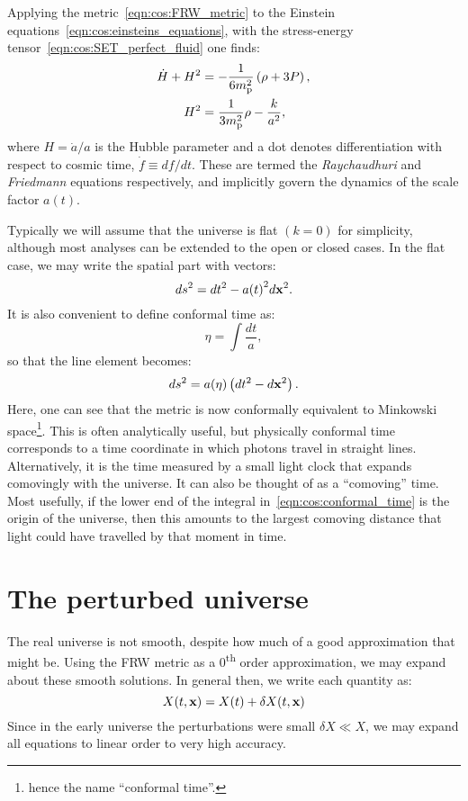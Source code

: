 Applying the metric~\eqref{eqn:cos:FRW_metric} to the Einstein equations~\eqref{eqn:cos:einsteins_equations}, with the stress-energy tensor~\eqref{eqn:cos:SET_perfect_fluid} one finds:
\begin{align}
  \dot{H}+H^2 &= 
  -\frac{1}{6m_{\mathrm{p}}^2}\left( \rho + 3P\right), 
  \label{eqn:Raychaudhuri_rho}
  \\
  H^2 &= 
  \frac{1}{3m_{\mathrm{p}}^2}\rho - \frac{k}{a^2}, 
\end{align}
%
where $H=\dot{a}/a$ is the Hubble parameter and a dot denotes differentiation with respect to cosmic time, $\dot{f}\equiv df/dt$. These are termed the {\em Raychaudhuri\/} and {\em Friedmann\/} equations respectively, and implicitly govern the dynamics of the scale factor $a(t)$. 


 Typically we will assume that the universe is flat $(k=0)$ for simplicity, although most analyses can be extended to the open or closed cases. In the flat case, we may write the spatial part with vectors:
\begin{equation}
  ds^2 = dt^2 - a{(t)}^2 d{\mathbf{x}}^2.
  \label{eqn:cos:flat_FRW}
\end{equation}
It is also convenient to define conformal time as:
\begin{equation}
  \eta = \int \frac{dt}{a},
  \label{eqn:cos:conformal_time}
\end{equation}
so that the line element becomes:
\begin{equation}
  ds^2 = a(\eta)\left( dt^2 - d{\mathbf{x}}^2 \right).
  \label{eqn:cos:flat_FRW}
\end{equation}
Here, one can see that the metric is now conformally equivalent to Minkowski space\footnote{hence the name ``conformal time''.}.
This is often analytically useful, but physically conformal time corresponds to a time coordinate in which photons travel in straight lines. Alternatively, it is the time measured by a small light clock that expands comovingly with the universe. It can also be thought of as a ``comoving'' time. Most usefully, if the lower end of the integral in~\eqref{eqn:cos:conformal_time} is the origin of the universe, then this amounts to the largest comoving distance that light could have travelled by that moment in time.
                                                                     
\section{The perturbed universe}
The real universe is not smooth, despite how much of a good approximation that might be. Using the FRW metric as a 0\textsuperscript{th} order approximation, we may expand about these smooth solutions. In general then, we write each quantity as:
\begin{equation}
  X(t,\mathbf{x}) = X(t) + \delta X(t,\mathbf{x})
  \label{eqn:cos:expansion}
\end{equation}
Since in the early universe the perturbations were small $\delta X \ll X$, we may expand all equations to linear order to very high accuracy.

